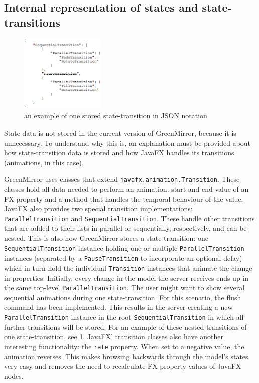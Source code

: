 \subsection{Internal representation of states and state-transitions}\label{sec:design;sub:states}
\begin{figure}\vspace{-20pt}
\begin{center}
\includegraphics[width=0.36\textwidth]{diagrams/transitiontree}
\end{center}
\vspace{-10pt}\caption{an example of one stored state-transition in JSON notation}\vspace{-12pt}
\label{fig:transitiontree}
\end{figure}
State data is not stored in the current version of GreenMirror, because it is unnecessary. To understand why this is, an explanation must be provided about how state-transition data is stored and how JavaFX handles its transitions (animations, in this case).
\par GreenMirror uses classes that extend \lstinline{javafx.animation.Transition}. These classes hold all data needed to perform an animation: start and end value of an FX property and a method that handles the temporal behaviour of the value. JavaFX also provides two special transition implementations: \lstinline{ParallelTransition} and \lstinline{SequentialTransition}. These handle other transitions that are added to their lists in parallel or sequentially, respectively, and can be nested.
This is also how GreenMirror stores a state-transition: one \lstinline{SequentialTransition} instance holding one or multiple \lstinline{ParallelTransition} instances (separated by a \lstinline{PauseTransition} to incorporate an optional delay) which in turn hold the individual \lstinline{Transition} instances that animate the change in properties. Initially, every change in the model the server receives ends up in the same top-level \lstinline{ParallelTransition}. The user might want to show several sequential animations during one state-transition. For this scenario, the flush command has been implemented. This results in the server creating a new \lstinline{ParallelTransition} instance in the root \lstinline{SequentialTransition} in which all further transitions will be stored. For an example of these nested transitions of one state-transition, see \cref{fig:transitiontree}. JavaFX' transition classes also have another interesting functionality: the \lstinline{rate} property. When set to a negative value, the animation reverses. This makes browsing backwards through the model's states very easy and removes the need to recalculate FX property values of JavaFX nodes.
